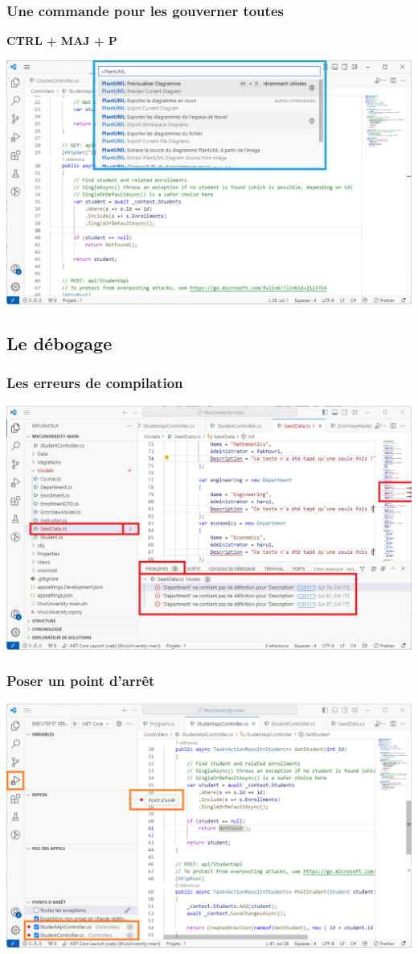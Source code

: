 \begin{frame}
    \frametitle{Une commande pour les gouverner toutes}
    \centering
    \Huge
    \textbf{CTRL + MAJ + P}

    \includegraphics[height=0.4\linewidth]{figures/environnement/commande-ultime}
\end{frame}


\subsection{Le débogage}
\label{subsec:debogage}

\begin{frame}
    \frametitle{Les erreurs de compilation}
    \centering
    \includegraphics[height=0.5\linewidth]{figures/environnement/erreurs-de-compilation}
\end{frame}

\begin{frame}
    \frametitle{Poser un point d'arrêt}
    \centering
    \includegraphics[height=0.5\linewidth]{figures/environnement/point-arret}
\end{frame}

